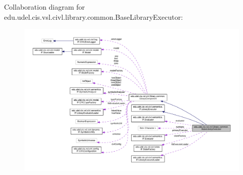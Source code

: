 Collaboration diagram for edu.\+udel.\+cis.\+vsl.\+civl.\+library.\+common.\+Base\+Library\+Executor\+:
\nopagebreak
\begin{figure}[H]
\begin{center}
\leavevmode
\includegraphics[width=350pt]{classedu_1_1udel_1_1cis_1_1vsl_1_1civl_1_1library_1_1common_1_1BaseLibraryExecutor__coll__graph}
\end{center}
\end{figure}
